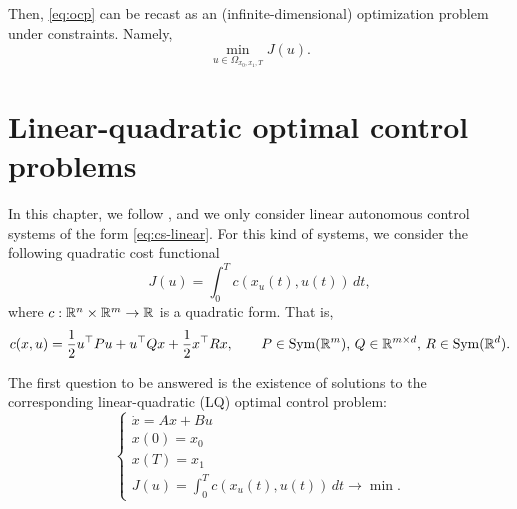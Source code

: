 Then, \eqref{eq:ocp} can be recast as an (infinite-dimensional) optimization problem under constraints. Namely,
\begin{equation}
    \min_{u\in \Omega_{x_0,x_1,T}} J(u).
\end{equation}

\section{Linear-quadratic optimal control problems}

In this chapter, we follow \cite{jurdjevicGeometric1997}, and we only consider linear autonomous control systems of the form \eqref{eq:cs-linear}.
For this kind of systems, we consider the following quadratic cost functional
\begin{equation}
    J(u) = \int_0^T c(x_u(t),u(t))\, dt,
\end{equation}
where $c:\mathbb{R}^n\times \mathbb{R}^m \to \mathbb{R}$ is a quadratic form. That is,
\begin{equation}
    c(x,u) = \frac12 u^\top Pu + u^\top Qx + \frac12 x^\top R x,
    \qquad P\in \operatorname{Sym}(\mathbb{R}^{m}), \, Q \in \mathbb{R}^{m\times d},\, R\in \operatorname{Sym}(\mathbb{R}^d).
\end{equation}

The first question to be answered is the existence of solutions to the corresponding linear-quadratic (LQ) optimal control problem:
\begin{equation}
   \label{eq:ocp-linear}
   \begin{cases}
    \dot x = A x + Bu \\
    x(0)=x_0 \\
    x(T) = x_1 \\
    J(u) = \int_0^T c(x_u(t),u(t))\, dt \rightarrow \min.
   \end{cases} 
\end{equation}


